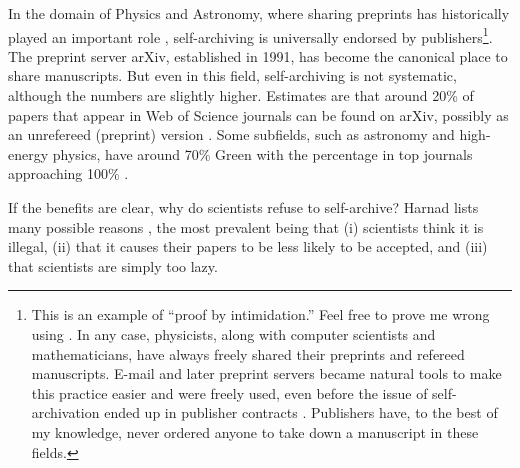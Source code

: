 \documentclass[11pt, openany, oneside, article, a4paper, twocolumn]{memoir}
\begin{document}
In the domain of Physics and Astronomy, where sharing preprints has
historically played an important role \cite{brown2001evolution},
self-archiving is universally endorsed by publishers\footnote{This is an
example of \enquote{proof by intimidation.} Feel free to prove me wrong
using \cite{sherpa_romeo}. In any case, physicists, along with computer
scientists and mathematicians, have always freely shared their preprints
and refereed manuscripts. E-mail and later preprint servers became natural
tools to make this practice easier and were freely used, even before the
issue of self-archivation ended up in publisher contracts
\cite{brown2001evolution}. Publishers have, to the best of my knowledge,
never ordered anyone to take down a manuscript in these fields.}. The
preprint server arXiv, established in 1991, has become the canonical place
to share manuscripts. But even in this field, self-archiving is not
systematic, although the numbers are slightly higher. Estimates are that
around 20\% of papers that appear in Web of Science journals can be found
on arXiv, possibly as an unrefereed (preprint) version
\cite{bjork2010open, lariviere2014arxiv}. Some subfields, such as
astronomy and high-energy physics, have around 70\% Green with the
percentage in top journals approaching 100\% \cite{gentil2010citinghep}.

If the benefits are clear, why do scientists refuse to self-archive?
Harnad lists many possible reasons \cite{harnad2006opening}, the most
prevalent being that (i) scientists think it is illegal, (ii) that it
causes their papers to be less likely to be accepted, and (iii) that
scientists are simply too lazy.
\end{document}
